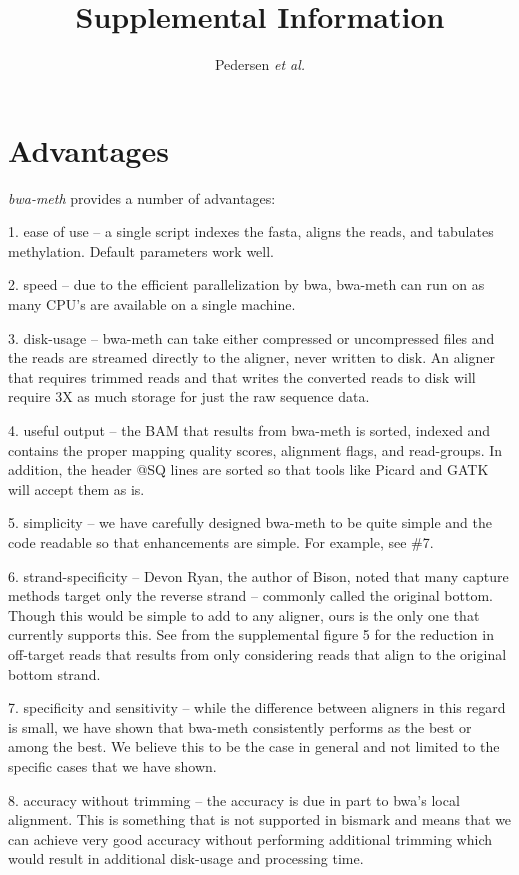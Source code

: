 \documentclass[12pt]{article}
\title{Supplemental Information}
\author{Pedersen \textit{et al.}}
\date{}
\begin{document}
\maketitle

\section{Advantages}
\textit{bwa-meth} provides a number of advantages:

1. ease of use -- a single script indexes the fasta, aligns the reads, and
   tabulates methylation. Default parameters work well.

2. speed -- due to the efficient parallelization by bwa, bwa-meth can run on
   as many CPU's are available on a single machine.

3. disk-usage -- bwa-meth can take either compressed or uncompressed files
   and the reads are streamed directly to the aligner, never written to disk. An
   aligner that requires trimmed reads and that writes the converted reads to
   disk will require 3X as much storage for just the raw sequence data.

4. useful output -- the BAM that results from bwa-meth is sorted, indexed and
   contains the proper mapping quality scores, alignment flags, and read-groups.
   In addition, the header @SQ lines are sorted so that tools like Picard and
   GATK will accept them as is.

5. simplicity -- we have carefully designed bwa-meth to be quite simple and
   the code readable so that enhancements are simple. For example, see \#7.

6. strand-specificity -- Devon Ryan,
   the author of Bison, noted that many capture methods target only the reverse
   strand -- commonly called the original bottom. Though this would be simple to
   add to any aligner, ours is the only one that currently supports this. See
   from the supplemental figure 5 for the reduction in off-target reads that results
   from only considering reads that align to the original bottom strand.

7. specificity and sensitivity -- while the difference between aligners in
   this regard is small, we have shown that bwa-meth consistently performs as
   the best or among the best. We believe this to be the case in general and
   not limited to the specific cases that we have shown.

8. accuracy without trimming -- the accuracy is due in part to bwa's local
   alignment. This is something that is not supported in bismark and means that
   we can achieve very good accuracy without performing additional trimming
   which would result in additional disk-usage and processing time.
\end{document}
